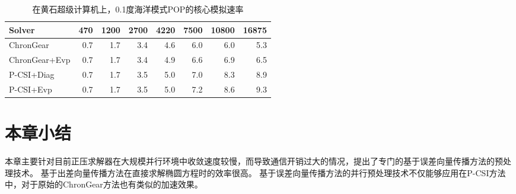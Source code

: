  
\begin{table}
\begin{center}
\caption {在黄石超级计算机上，0.1度海洋模式POP的核心模拟速率\label{tab:improve_01}}
\begin{tabular}{|l||r|r|r|r|r|r|r|}
\hline
Solver & 470  & 1200   & 2700 & 4220 & 7500 & 10800 & 16875\\\hline
\hline
ChronGear     &0.7 &1.7&3.4  &4.6 &6.0 &6.0 &5.3\\\hline
ChronGear+Evp &0.7 &1.7&3.4  &4.9 &6.6 &6.9 &6.5\\\hline
P-CSI+Diag    &0.7 &1.7&3.5  &5.0 &7.0 &8.3 &8.9\\\hline
P-CSI+Evp     &0.7 &1.7&3.5  &5.0 &7.2 &8.6 &9.3\\
\hline
\end{tabular}
\end{center}
\end{table}

\section{本章小结}
\label{precond:Conclusion}

本章主要针对目前正压求解器在大规模并行环境中收敛速度较慢，而导致通信开销过大的情况，提出了专门的基于误差向量传播方法的预处理技术。
基于出差向量传播方法在直接求解椭圆方程时的效率很高。 
基于误差向量传播方法的并行预处理技术不仅能够应用在P-CSI方法中，对于原始的ChronGear方法也有类似的加速效果。

